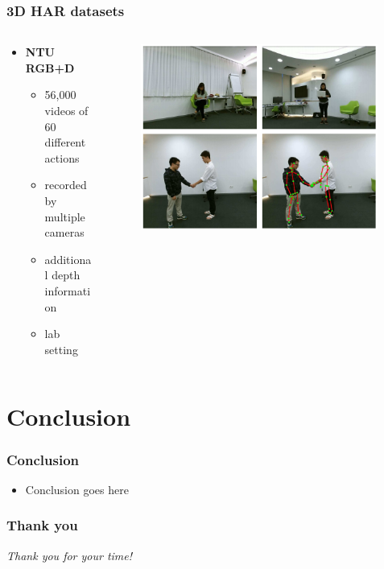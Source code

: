 \documentclass[9pt]{beamer}
\newenvironment{myframe}[1][]{%
\begin{frame}%
\frametitle{#1}
\setcounter{footnote}{0}


}{%
\end{frame}%
}
\begin{document}
\begin{myframe}[3D HAR datasets]
  \begin{columns}[T]
      \begin{column}{.48\textwidth}
          \vspace{35px}
          \begin{itemize}
              \item \textbf{NTU RGB+D \footnotemark}
              \begin{itemize}
                  \item 56,000 videos of 60 different actions
                  \item recorded by multiple cameras
                  \item additional depth information
                  \item lab setting
              \end{itemize}
          \end{itemize}
      \end{column}
      \begin{column}{.48\textwidth}
          \begin{figure}
              \includegraphics[width=0.99\textwidth]{ntu-example.png}
          \end{figure}
      \end{column}
  \end{columns}
\end{myframe}
\section{Conclusion}
\begin{myframe}[Conclusion]
    \begin{itemize}
        \item Conclusion goes here
    \end{itemize}
\end{myframe}

\begin{myframe}[Thank you]
    \centering \Large
    \emph{Thank you for your time!}
\end{myframe}
\end{document}
